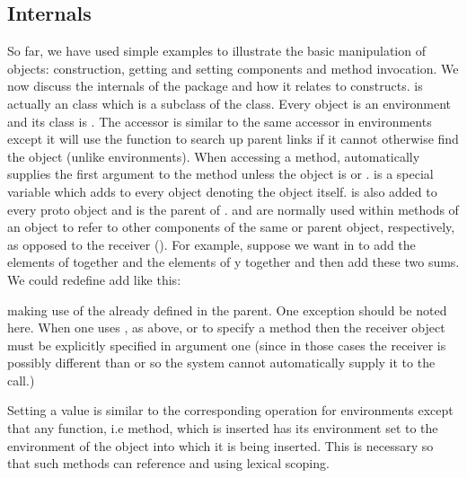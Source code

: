 \documentclass{Z}
\begin{document}
\subsection{Internals}
\label{sec:internals}

So far, we have used simple examples to illustrate the basic manipulation
of objects: construction, getting and setting components and method 
invocation.  We now discuss the internals of the package and how it relates
to  constructs.  
 is actually an  class which is a subclass
of the  class.  Every  object is an
environment and its class is .  The \code{\$}
accessor is similar to the same accessor in environments except it will
use the   function to 
search up parent links if it cannot otherwise find the object (unlike
environments).  When accessing a method, \code{\$} 
automatically supplies the
first argument to the method
unless the object is  or .  
is a special variable which  adds to every  object
denoting the object itself.   is also added to every
proto object and is the parent of .  
and  are normally used
within methods of an object to refer to other components of the same
or parent object, respectively,
as opposed to the receiver ().  For example,
suppose we want  in  to add the elements
of  together and the elements of
{y} together and then add these two sums.  We could redefine add like this:

\begin{Schunk}
\end{Schunk}

making use of the  already defined in the parent.
One exception should be noted here.  When one uses ,
as above, or  to specify a method then the receiver
object must be explicitly specified 
in argument one (since in those cases the receiver
is possibly different than
 or  so the system cannot automatically supply it
to the call.)

Setting a value is similar to the corresponding operation for
environments except that any function, i.e method, which is
inserted has its environment set to the environment of the object
into which it is being inserted.  This is necessary so that such
methods can reference  and  using
lexical scoping.  
\end{document}
